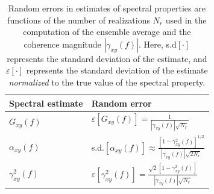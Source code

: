 \begin{table}[t]
  \centering
  \renewcommand{\arraystretch}{1.5}%
  \begin{tabular}{%
    >{\centering}m{5.0cm} >{\centering}m{5.0cm}
  }
    \toprule%
    \textbf{Spectral estimate}
    & \textbf{Random error} \cite{bendat_and_piersol}
    \tabularnewline%
    \midrule
    $G_{xy}(f)$
    & $\varepsilon \left[G_{xy}(f) \right]
    =
    \frac{1}{|\gamma_{xy}(f)| \sqrt{N_r}}$
    \tabularnewline%
    $\alpha_{xy}(f)$
    & s.d.$\left[ \alpha_{xy}(f) \right]
    \approx
    \frac{[1 - \gamma_{xy}^2(f)]^{1/2}}{|\gamma_{xy}(f)| \sqrt{2 N_r}}$
    \tabularnewline%
    $\gamma_{xy}^2(f)$
    & $\varepsilon \left[ \gamma_{xy}^2(f) \right]
    =
    \frac{\sqrt{2} [1 - \gamma_{xy}^2(f)]}{|\gamma_{xy}(f)| \sqrt{N_r}}$
    \tabularnewline%
    \toprule%
  \end{tabular}
  \caption[Random errors in spectral estimates]{%
    Random errors in estimates of spectral properties are functions of
    the number of realizations $N_r$ used
    in the computation of the ensemble average and
    the coherence magnitude $|\gamma_{xy}(f)|$.
    Here, s.d$[\cdot]$ represents the standard deviation of the estimate, and
    $\varepsilon[\cdot]$ represents the standard deviation of the estimate
    \emph{normalized} to the true value of the spectral property.
    }%
\label{table:ToroidalCorrelation:spectral_estimate_random_errors}
\end{table}


